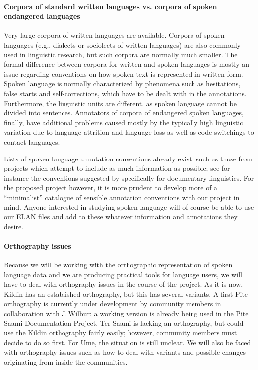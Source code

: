\documentclass[a4paper,12pt]{article}
\begin{document}
\paragraph{Corpora of standard written languages vs. corpora of spoken endangered languages} 
Very large corpora of written languages are available. Corpora of spoken languages (e.g., dialects or sociolects of written languages) are also commonly used in linguistic research, but such corpora are normally much smaller. The formal difference between corpora for written and spoken languages is mostly an issue regarding conventions on how spoken text is represented in written form. Spoken language is normally characterized by phenomena such as hesitations, false starts and self-corrections, which have to be dealt with in the annotations. Furthermore, the linguistic units are different, as spoken language cannot be divided into sentences. Annotators of corpora of endangered spoken languages, finally, have additional problems caused mostly by the typically high linguistic variation due to language attrition and language loss as well as code-switchings to contact languages.

Lists of spoken language annotation conventions already exist, such as those from projects which attempt to include as much information as possible; see for instance the conventions suggested by \citealt{schulze-bernd2006} specifically for documentary linguistics. For the proposed project however, it is more prudent to develop more of a “minimalist” catalogue of sensible annotation conventions with our project in mind. Anyone interested in studying spoken language will of course be able to use our ELAN files and add to these whatever information and annotations they desire.

\paragraph{Orthography issues}
Because we will be working with the orthographic representation of spoken language data and we are producing practical tools for language users, we will have to deal with orthography issues in the course of the project. As it is now, Kildin has an established orthography, but this has several variants. A first Pite orthography is currently under development by community members in collaboration with J.\,Wilbur; a working version is already being used in the Pite Saami Documentation Project. Ter Saami is lacking an orthography, but could use the Kildin orthography fairly easily; however, community members must decide to do so first. For Ume, the situation is still unclear. We will also be faced with orthography issues such as how to deal with variants and possible changes originating from inside the communities.
\end{document}
